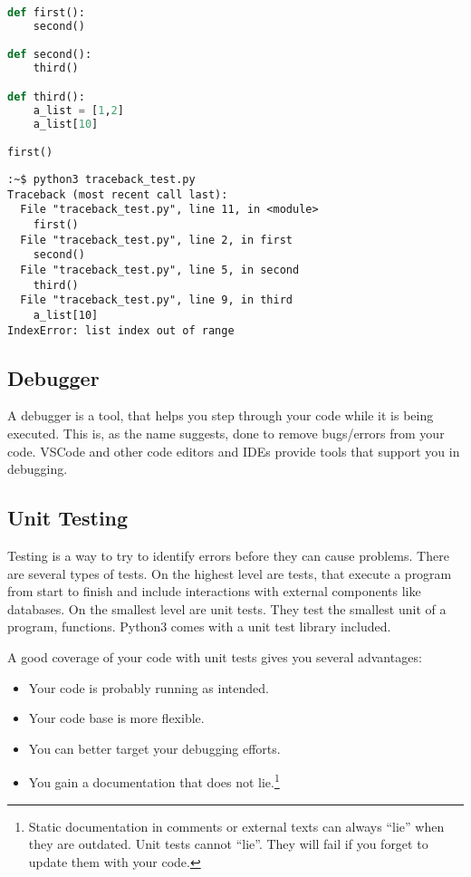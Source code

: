 \documentclass{article}
\newcommand{\qq}[1]{``#1''}
\begin{document}
\begin{lstlisting}[language=python]
def first():
    second()

def second():
    third()

def third():
    a_list = [1,2]
    a_list[10]

first()
\end{lstlisting}

\begin{lstlisting}
:~$ python3 traceback_test.py 
Traceback (most recent call last):
  File "traceback_test.py", line 11, in <module>
    first()
  File "traceback_test.py", line 2, in first
    second()
  File "traceback_test.py", line 5, in second
    third()
  File "traceback_test.py", line 9, in third
    a_list[10]
IndexError: list index out of range
\end{lstlisting}

\subsection{Debugger}

A debugger is a tool, that helps you step through your code while it is being executed.
This is, as the name suggests, done to remove bugs/errors from your code.
VSCode and other code editors and IDEs provide tools that support you in debugging.

\subsection{Unit Testing}

Testing is a way to try to identify errors before they can cause problems.
There are several types of tests.
On the highest level are tests, that execute a program from start to finish
and include interactions with external components like databases.
On the smallest level are unit tests.
They test the smallest unit of a program, functions.
Python3 comes with a unit test library included.

A good coverage of your code with unit tests gives you several advantages:

\begin{itemize}
    \item Your code is probably running as intended.
    \item Your code base is more flexible.
    \item You can better target your debugging efforts.
    \item You gain a documentation that does not lie.\footnote{
              Static documentation in comments or external texts can always
              \qq{lie} when they are outdated.
              Unit tests cannot \qq{lie}.
              They will fail if you forget to update them with your code.}
\end{itemize}
\end{document}
